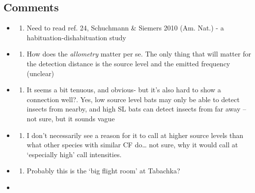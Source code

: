 \documentclass[
]{book}
\providecommand{\tightlist}{%
  \setlength{\itemsep}{0pt}\setlength{\parskip}{0pt}}
\begin{document}
\hypertarget{com_shuchsiem}{%
\subsection{Comments}\label{com_shuchsiem}}

\begin{itemize}
\item
  \begin{enumerate}
  \def\labelenumi{\arabic{enumi}.}
  \tightlist
  \item
    Need to read ref. 24, Schuchmann \& Siemers 2010 (Am. Nat.) - a habituation-dishabituation study
  \end{enumerate}
\item
  \begin{enumerate}
  \def\labelenumi{\arabic{enumi}.}
  \setcounter{enumi}{1}
  \tightlist
  \item
    How does the \emph{allometry} matter per se. The only thing that will matter for the detection distance is the source level and the emitted frequency (unclear)
  \end{enumerate}
\item
  \begin{enumerate}
  \def\labelenumi{\arabic{enumi}.}
  \setcounter{enumi}{2}
  \tightlist
  \item
    It seems a bit tenuous, and obvious- but it's also hard to show a connection well?. Yes, low source level bats may only be able to detect insects from nearby, and high SL bats can detect insects from far away -- not sure, but it sounds vague
  \end{enumerate}
\item
  \begin{enumerate}
  \def\labelenumi{\arabic{enumi}.}
  \setcounter{enumi}{3}
  \tightlist
  \item
    I don't necessarily see a reason for it to call at higher source levels than what other species with similar CF do\ldots{} not sure, why it would call at `especially high' call intensities.
  \end{enumerate}
\item
  \begin{enumerate}
  \def\labelenumi{\arabic{enumi}.}
  \setcounter{enumi}{4}
  \tightlist
  \item
    Probably this is the `big flight room' at Tabachka?
  \end{enumerate}
\item
  \begin{enumerate}
  \def\labelenumi{\arabic{enumi}.}

\end{enumerate}
\end{itemize}
\end{document}
